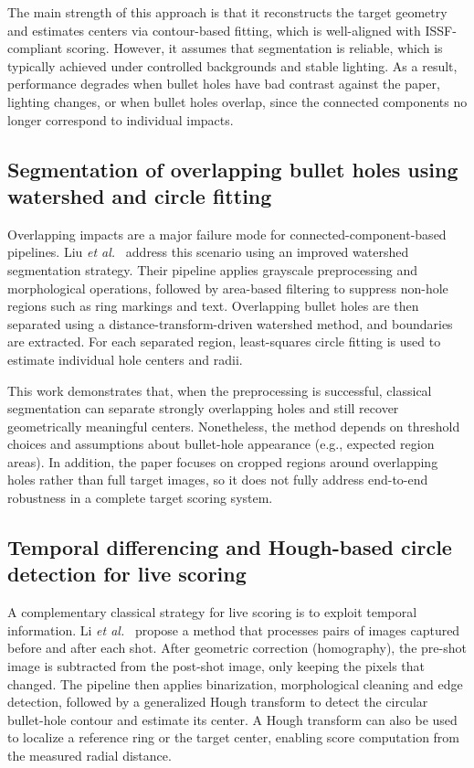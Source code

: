 The main strength of this approach is that it reconstructs the target geometry and estimates
centers via contour-based fitting, which is well-aligned with ISSF-compliant scoring. However, it
assumes that segmentation is reliable, which is typically achieved under controlled backgrounds and
stable lighting. As a result, performance degrades when bullet holes have bad contrast against the
paper, lighting changes, or when bullet holes overlap, since the connected components
no longer correspond to individual impacts.



\subsection{Segmentation of overlapping bullet holes using watershed and circle fitting}
Overlapping impacts are a major failure mode for connected-component-based
pipelines. Liu \textit{et al.}~\cite{liu2023_watershed} address this scenario using an improved
watershed segmentation strategy. Their pipeline applies grayscale preprocessing and morphological
operations, followed by area-based filtering to suppress non-hole regions such as ring markings and
text. Overlapping bullet holes are then separated using a distance-transform-driven watershed method,
and boundaries are extracted. For each separated region, least-squares
circle fitting is used to estimate individual hole centers and radii.

This work demonstrates that, when the preprocessing is successful, classical segmentation can separate
strongly overlapping holes and still recover geometrically meaningful centers. Nonetheless, the method
depends on threshold choices and assumptions about bullet-hole appearance (e.g., expected region
areas). In addition, the paper focuses on cropped regions around overlapping holes rather than full
target images, so it does not fully address end-to-end robustness in a complete target scoring system.



\subsection{Temporal differencing and Hough-based circle detection for live scoring}
A complementary classical strategy for live scoring is to exploit temporal information. Li
\textit{et al.}~\cite{li2022_imagesubtraction_hough} propose a method that processes pairs of images
captured before and after each shot. After geometric correction (homography), the pre-shot image is
subtracted from the post-shot image, only keeping the pixels that changed.
The pipeline then applies binarization, morphological cleaning and edge detection, followed by a
generalized Hough transform to detect the circular bullet-hole contour and estimate its center. A Hough
transform can also be used to localize a reference ring or the target center, enabling score computation
from the measured radial distance.

